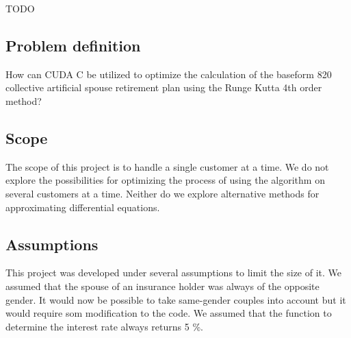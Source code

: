 
TODO

\subsection{Problem definition}
How can CUDA C be utilized to optimize the calculation of the baseform 820 collective artificial spouse retirement plan using the Runge Kutta 4th order method?

\subsection{Scope}
	The scope of this project is to handle a single customer at a time. We do not explore the possibilities for optimizing the process of using the algorithm on several customers at a time. Neither do we explore alternative methods for approximating differential equations.
	
\subsection{Assumptions}
This project was developed under several assumptions to limit the size of it. We assumed that the spouse of an insurance holder was always of the opposite gender. It would now be possible to take same-gender couples into account but it would require som modification to the code. We assumed that the function to determine the interest rate always returns 5 \%. 


